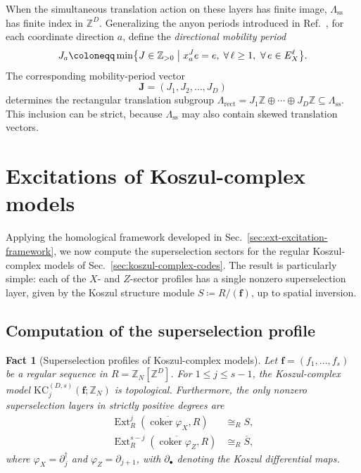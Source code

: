 \documentclass[aps,prx,english,superscriptaddress,twocolumn,tightenlines,showpacs,longbibliography,floatfix,amsfonts]{revtex4-2}
\newtheorem{fact}{Fact}
\theoremstyle{remark}
\theoremstyle{definition}
\begin{document}
When the simultaneous translation action on these layers has finite image,
\(\Lambda_{\mathrm{ss}}\) has finite index in \(\mathbb Z^D\). Generalizing
the anyon periods introduced in Ref.~\cite{Chen2025PRL}, for each coordinate
direction \(a\), define the \emph{directional mobility period}
\begin{equation}
	J_a\coloneqq
	\min\bigl\{J\in\mathbb Z_{>0}\bigm|
	x_a^J e=e,\; \forall\,\ell\geq 1,\ \forall\,e\in E_X^\ell\bigr\}.
	\label{eq:coordinate-periods}
\end{equation}
The corresponding mobility-period vector
\begin{equation}
	\mathbf J=(J_1,J_2,\dots,J_D)
\end{equation}
determines the rectangular translation subgroup
\(\Lambda_{\mathrm{rect}}
=J_1\mathbb Z\oplus\cdots\oplus J_D\mathbb Z
\subseteq\Lambda_{\mathrm{ss}}\).
This inclusion can be strict, because \(\Lambda_{\mathrm{ss}}\) may also
contain skewed translation vectors.

\section{Excitations of Koszul-complex models}
\label{sec:regular-koszul-excitations}

Applying the homological framework developed in Sec.~\ref{sec:ext-excitation-framework}, we now compute the superselection sectors for the regular Koszul-complex models of Sec.~\ref{sec:koszul-complex-codes}. The result is particularly simple: each of the \(X\)- and \(Z\)-sector profiles has a single nonzero superselection layer, given by the Koszul structure module $S \coloneqq R/(\mathbf{f})$, up to spatial inversion.

\subsection{Computation of the superselection profile}

\begin{fact}[Superselection profiles of Koszul-complex models]
	\label{fact:koszul-excitation}
	Let $\mathbf{f}=(f_1,\dots,f_s)$ be a regular sequence in $R=\mathbb{Z}_{N}[\mathbb{Z}^D]$. For $1\le j\le s-1$, the Koszul-complex model $\mathrm{KC}_j^{(D,s)}(\mathbf{f}; \mathbb{Z}_N)$ is topological. Furthermore, the only nonzero superselection layers in strictly positive degrees are
	\begin{align}
		\operatorname{Ext}_R^j(\overline{\operatorname{coker}\varphi_X}, R)
		&\cong_R S, \label{eq:X-sector-Ext-rigidity}\\
		\operatorname{Ext}_R^{s-j}(\overline{\operatorname{coker}\varphi_Z}, R)
		&\cong_R \overline{S}, \label{eq:Z-sector-Ext-rigidity}
	\end{align}
	where $\varphi_X = \partial_j^\dagger$ and $\varphi_Z = \partial_{j+1}$, with $\partial_\bullet$ denoting the Koszul differential maps.
\end{fact}
\end{document}
